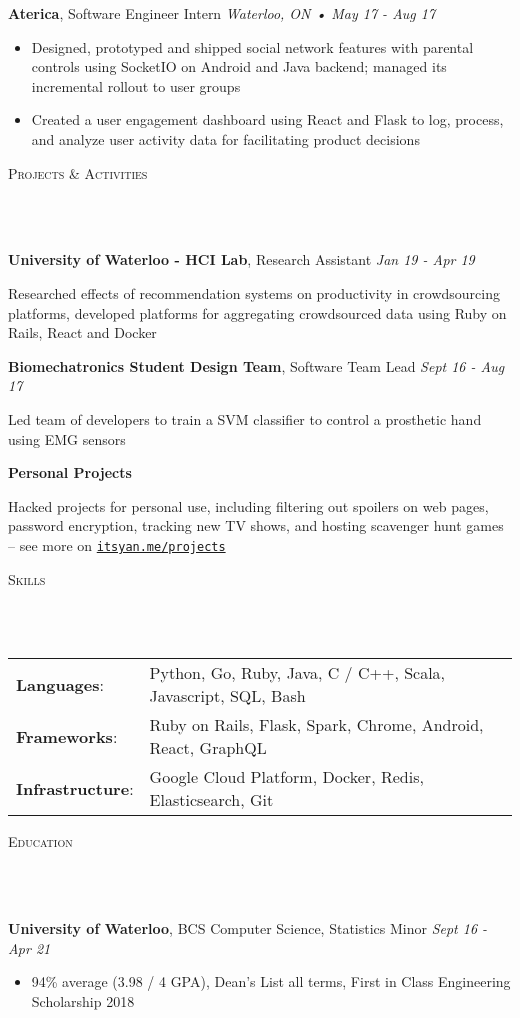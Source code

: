 \documentclass[a4paper, 11pt, hidelinks]{article}
\newcommand{\lineunder} {
    \vspace*{-8pt} \\
    \hrulefill \\
}
\newcommand{\header} [1] {
    \color{bigtext}
    {\hspace*{-4pt}\vspace*{6pt} \textsc{#1}}
    \vspace*{-6pt}
    \color{bodytext}
    \lineunder
    \vspace{6pt}
}
\newcommand{\jobheader} [4] {
    \color{bigtext}\textbf{#1}, #2 \color{weaktext}\hfill\textit{#3 • #4}\\
    \vspace{-2mm} \color{bodytext}
}
\newcommand{\nolocheader} [3] {
    \color{bigtext}\textbf{#1}, #2 \color{weaktext}\hfill\textit{#3}\\
    \color{bodytext}
}
\newcommand{\minheader} [1] {
    \color{bigtext}\textbf{#1}\hfill\\
    \color{bodytext}
}
\begin{document}
\jobheader{Aterica}{Software Engineer Intern}{Waterloo, ON}{May 17 - Aug 17}
\begin{itemize}[leftmargin=2em] \itemsep 1pt \color{bodytext}
	\item Designed, prototyped and shipped social network features with parental controls using SocketIO on
    Android and Java backend; managed its incremental rollout to user groups
	\item Created a user engagement dashboard using React and Flask to log, process, and analyze user activity
    data for facilitating product decisions
\end{itemize}

\header{Projects \& Activities}
\nolocheader{University of Waterloo - HCI Lab}{Research Assistant}{Jan 19 - Apr 19}
Researched effects of recommendation systems on productivity in crowdsourcing platforms,
developed platforms for aggregating crowdsourced data using Ruby on Rails, React and Docker \\
\vspace{3mm}

\nolocheader{Biomechatronics Student Design Team}{Software Team Lead}{Sept 16 - Aug 17}
Led team of developers to train a SVM classifier to control a prosthetic hand using EMG sensors\\
\vspace{3mm}

\minheader{Personal Projects}
Hacked projects for personal use, including filtering out spoilers on web pages, password
encryption, tracking new TV shows, and hosting scavenger hunt games -- see more on
\texttt{\href{http://www.itsyan.me/projects}{itsyan.me/projects}}\\
\vspace{3mm}

\header{Skills}
\hspace{-10pt}
\begin{tabular}{ l l }
    \color{bigtext}\textbf{Languages}:\color{bodytext} & Python, Go, Ruby, Java, C / C++, Scala, Javascript, SQL, Bash \\[2pt]
    \color{bigtext}\textbf{Frameworks}:\color{bodytext} & Ruby on Rails, Flask, Spark, Chrome, Android, React, GraphQL \\[2pt]
    \color{bigtext}\textbf{Infrastructure}:\color{bodytext} & Google Cloud Platform, Docker, Redis, Elasticsearch, Git
\end{tabular}
\vspace{3mm}

\header{Education}
\nolocheader{University of Waterloo}{BCS Computer Science, Statistics Minor}{Sept 16 - Apr 21}
\vspace{-2mm}
\begin{itemize}[leftmargin=2em] \itemsep 1pt
	\item 94\% average (3.98 / 4 GPA), Dean's List all terms, First in Class Engineering Scholarship 2018
\end{itemize}
\end{document}

